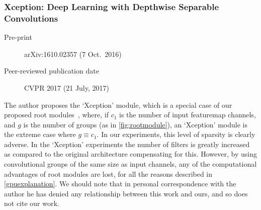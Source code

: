\documentclass[thesis]{subfiles}
\begin{document}
\subsubsection*{Xception: Deep Learning with Depthwise Separable Convolutions}
\begin{description}
    \item[Pre-print] arXiv:1610.02357 (7 Oct.\ 2016)
    \item[Peer-reviewed publication date] CVPR 2017 (21 July, 2017)
\end{description}
The author proposes the `Xception' module, which is a special case of our proposed root modules~\citep{ioannou2016e}, where, if $c_1$ is the number of input \gls{featuremap} channels, and $g$ is the number of groups (as in \cref{fig:rootmodule}), an `Xception' module is the extreme case where $g \equiv c_1$. In our experiments, this level of sparsity is clearly adverse. In the `Xception' experiments the number of filters is greatly increased as compared to the original architecture compensating for this. However, by using convolutional groups of the same size as input channels, any of the computational advantages of root modules are lost, for all the reasons described in \cref{gpuexplanation}. We should note that in personal correspondence with the author he has denied any relationship between this work and ours, and so does not cite our work.


\end{document}
